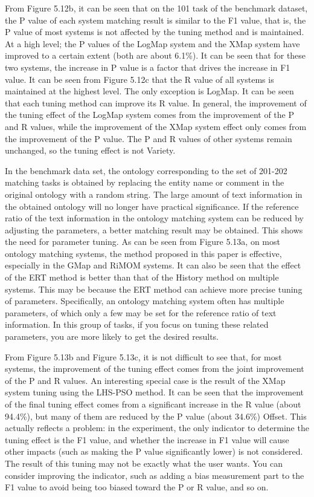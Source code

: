 \documentclass[twoside]{article}
\begin{document}
\begin{multicols}{2}
From Figure 5.12b, it can be seen that on the 101 task of the benchmark dataset, the P value of each system matching result is similar to the F1 value, that is, the P value of most systems is not affected by the tuning method and is maintained. 
At a high level; the P values of the LogMap system and the XMap system have improved to a certain extent (both are about 6.1\%). It can be seen that for these two systems, the increase in P value is a factor that drives the increase in F1 value. 
It can be seen from Figure 5.12c that the R value of all systems is maintained at the highest level. The only exception is LogMap. It can be seen that each tuning method can improve its R value. 
In general, the improvement of the tuning effect of the LogMap system comes from the improvement of the P and R values, while the improvement of the XMap system effect only comes from the improvement of the P value. The P and R values of other systems remain unchanged, so the tuning effect is not Variety.

In the benchmark data set, the ontology corresponding to the set of 201-202 matching tasks is obtained by replacing the entity name or comment in the original ontology with a random string. The large amount of text information in the obtained ontology will no longer have practical significance. 
If the reference ratio of the text information in the ontology matching system can be reduced by adjusting the parameters, a better matching result may be obtained. 
This shows the need for parameter tuning. 
As can be seen from Figure 5.13a, on most ontology matching systems, the method proposed in this paper is effective, especially in the GMap and RiMOM systems. 
It can also be seen that the effect of the ERT method is better than that of the History method on multiple systems. This may be because the ERT method can achieve more precise tuning of parameters. 
Specifically, an ontology matching system often has multiple parameters, of which only a few may be set for the reference ratio of text information. In this group of tasks, if you focus on tuning these related parameters, you are more likely to get the desired results.

From Figure 5.13b and Figure 5.13c, it is not difficult to see that, for most systems, the improvement of the tuning effect comes from the joint improvement of the P and R values. 
An interesting special case is the result of the XMap system tuning using the LHS-PSO method. It can be seen that the improvement of the final tuning effect comes from a significant increase in the R value (about 94.4\%), but many of them are reduced by the P value (about 34.6\%) Offset. 
This actually reflects a problem: in the experiment, the only indicator to determine the tuning effect is the F1 value, and whether the increase in F1 value will cause other impacts (such as making the P value significantly lower) is not considered. The result of this tuning may not be exactly what the user wants. 
You can consider improving the indicator, such as adding a bias measurement part to the F1 value to avoid being too biased toward the P or R value, and so on.


\end{multicols}
\end{document}
